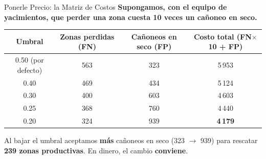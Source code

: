 \documentclass[aspectratio=169, 11pt]{beamer}
\begin{document}
\begin{frame}[shrink=10]{Ponerle Precio: la Matriz de Costos}
  \vspace{-4pt}
  {\small\color{arcaDark}\bfseries
    Supongamos, con el equipo de yacimientos, que \textbf{perder una zona cuesta 10 veces} un cañoneo en seco.}

  \vspace{5pt}
  \centering
  {\footnotesize
  \renewcommand{\arraystretch}{1.4}
  \begin{tabular}{@{}c c c c@{}}
    \toprule
    {\bfseries\color{arcaRed} Umbral} & {\bfseries\color{arcaDark} Zonas perdidas (FN)}
      & {\bfseries\color{arcaDark} Cañoneos en seco (FP)}
      & {\bfseries\color{arcaDark} Costo total (FN\(\times\)10 + FP)} \\
    \midrule
    0.50 \tiny(por defecto) & 563 & 323 & 5\,953 \\
    \rowcolor{arcaGray}
    0.40 & 469 & 434 & 5\,124 \\
    0.30 & 400 & 603 & 4\,603 \\
    \rowcolor{arcaGray}
    0.25 & 368 & 760 & 4\,440 \\
    0.20 & 324 & 939 & {\color{codeGreen}\bfseries 4\,179} \\
    \bottomrule
  \end{tabular}
  }

  \vspace{8pt}
  {\footnotesize\color{textMuted}
    \faLightbulb[regular]\hspace{4pt}%
    Al bajar el umbral aceptamos \textbf{más} cañoneos en seco (323 \(\to\) 939)
    para rescatar \textbf{239 zonas productivas}. En dinero, el cambio
    \textbf{conviene}.}
\end{frame}
\end{document}
